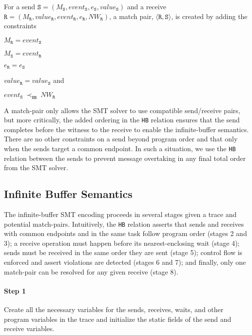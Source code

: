 \begin{definition}
For a send $\mathtt{S}=(M_\mathtt{S},\mathit{event}_\mathtt{S}, e_\mathtt{S},\mathit{value}_\mathtt{S})$ and a receive $\mathtt{R}=(M_\mathtt{R},\mathit{value}_\mathtt{R}, \mathit{event}_\mathtt{R}, e_\mathtt{R},\mathit{NW}_\mathtt{R})$, a match pair, $\langle\mathtt{R}, \mathtt{S}\rangle$, is created by adding the constraints
\begin{compactenum}
\item $M_{\mathtt{R}} = event_{\mathtt{S}}$
\item $M_{\mathtt{S}} = event_{\mathtt{R}}$
\item $e_{\mathtt{R}} = e_{\mathtt{S}}$
\item $value_{\mathtt{R}} = value_{\mathtt{S}}$ and
\item $event_{\mathtt{S}}\ \mathrm{\prec_\mathtt{HB}}\ \mathit{NW}_{\mathtt{R}}$
\end{compactenum}
\label{def:match}
\end{definition}

A match-pair only allows the SMT solver to use compatible send/receive
pairs, but more critically, the added ordering in the \texttt{HB}
relation ensures that the send completes before the witness to the
receive to enable the infinite-buffer semantics. There are no other
constraints on a send beyond program order and that only when the
sends target a common endpoint. In such a situation, we use the
\texttt{HB} relation between the sends to prevent message overtaking in
any final total order from the SMT solver.

\subsection{Infinite Buffer Semantics}

The infinite-buffer SMT encoding proceeds in several stages given a
trace and potential match-pairs. Intuitively, the \texttt{HB} relation
asserts that sends and receives with common endpoints and in the same
task follow program order (stages 2 and 3); a receive operation must
happen before its nearest-enclosing wait (stage 4); sends must be
received in the same order they are sent (stage 5); control flow is
enforced and assert violations are detected (stages 6 and 7); and
finally, only one match-pair can be resolved for any given receive
(stage 8).

\paragraph*{Step 1} Create all the necessary variables for the sends,
receives, waits, and other program variables in the trace and
initialize the static fields of the send and receive variables.


